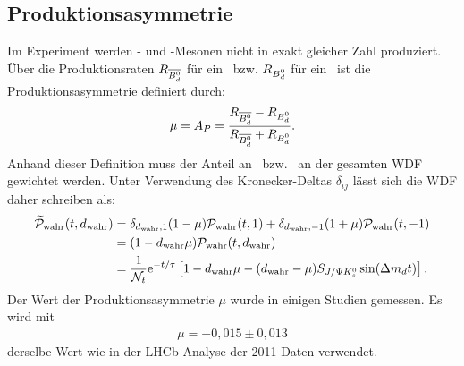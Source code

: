 \subsection{Produktionsasymmetrie}
Im Experiment werden \Bd- und \Bdbar-Mesonen nicht in exakt gleicher Zahl produziert. Über die Produktionsraten $R_{\text{$\overline{B_d^0}$}}$ für ein \Bdbar\ bzw. $R_{\text{$B_d^0$}}$ für ein \Bd\ ist die Produktionsasymmetrie definiert durch:
\begin{align}
\mu = A_P = \frac{R_{\text{$\overline{B_d^0}$}}-R_{\text{$B_d^0$}}}{R_{\text{$\overline{B_d^0}$}}+R_{\text{$B_d^0$}}}.
\end{align}
Anhand dieser Definition muss der Anteil an \Bd\ bzw. \Bdbar\ an der gesamten WDF gewichtet werden. Unter Verwendung des Kronecker-Deltas $\delta_{ij}$ lässt sich die WDF daher schreiben als:
\begin{align}
\nonumber \widetilde{\mathcal{P}}_{\text{wahr}}(t, d_{\text{wahr}}) &= \delta_{d_{\text{wahr}},1}(1-\mu)\mathcal{P}_{\text{wahr}}(t, 1) + \delta_{d_{\text{wahr}},-1}(1+\mu)\mathcal{P}_{\text{wahr}}(t, -1) \\
\nonumber &= (1-d_{\text{wahr}}\mu)\mathcal{P}_{\text{wahr}}(t, d_{\text{wahr}}) \\
&= \frac{1}{\mathcal{N}_t}\mathrm{e}^{-t/\tau}\left[1-d_{\text{wahr}}\mu - (d_{\text{wahr}}-\mu)S_{J/\Psi K_s^0}\sin(\Delta m_d t)\right].
\end{align}
Der Wert der Produktionsasymmetrie $\mu$ wurde in einigen Studien gemessen. Es wird mit 
\begin{align}
\mu = -0,015 \pm 0,013
\end{align}
derselbe Wert wie in der LHCb Analyse der 2011 Daten \cite{lhcb-paper} verwendet.

